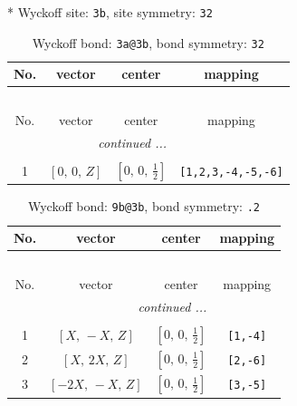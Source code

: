 \documentclass[fleqn,8pt]{jsarticle}
\begin{document}
* Wyckoff site: {\tt 3b}, site symmetry: {\tt 32}
\renewcommand{\arraystretch}{1.2}
\begin{longtable}{cccc}
\caption{Wyckoff bond: {\tt 3a@3b}, bond symmetry: {\tt 32}}
 \\
 \hline \hline
No. & vector & center & mapping \\ \hline \endfirsthead

\multicolumn{3}{l}{\tablename\ \thetable{}} \\
 \hline \hline
No. & vector & center & mapping \\ \hline \endhead

 \hline \hline
\multicolumn{3}{r}{\footnotesize\it continued ...} \\ \endfoot

 \hline \hline
\multicolumn{3}{r}{} \\ \endlastfoot

1 & $\left[ 0,\, 0,\, Z \right]$ & $\left[ 0,\, 0,\, \frac{1}{2} \right]$ & {\tt [1,2,3,-4,-5,-6]} \\
\end{longtable}
\renewcommand{\arraystretch}{1.2}
\begin{longtable}{cccc}
\caption{Wyckoff bond: {\tt 9b@3b}, bond symmetry: {\tt .2}}
 \\
 \hline \hline
No. & vector & center & mapping \\ \hline \endfirsthead

\multicolumn{3}{l}{\tablename\ \thetable{}} \\
 \hline \hline
No. & vector & center & mapping \\ \hline \endhead

 \hline \hline
\multicolumn{3}{r}{\footnotesize\it continued ...} \\ \endfoot

 \hline \hline
\multicolumn{3}{r}{} \\ \endlastfoot

1 & $\left[ X,\, - X,\, Z \right]$ & $\left[ 0,\, 0,\, \frac{1}{2} \right]$ & {\tt [1,-4]} \\ \hline
2 & $\left[ X,\, 2 X,\, Z \right]$ & $\left[ 0,\, 0,\, \frac{1}{2} \right]$ & {\tt [2,-6]} \\ \hline
3 & $\left[ - 2 X,\, - X,\, Z \right]$ & $\left[ 0,\, 0,\, \frac{1}{2} \right]$ & {\tt [3,-5]} \\
\end{longtable}
\renewcommand{\arraystretch}{1.2}
\end{document}

